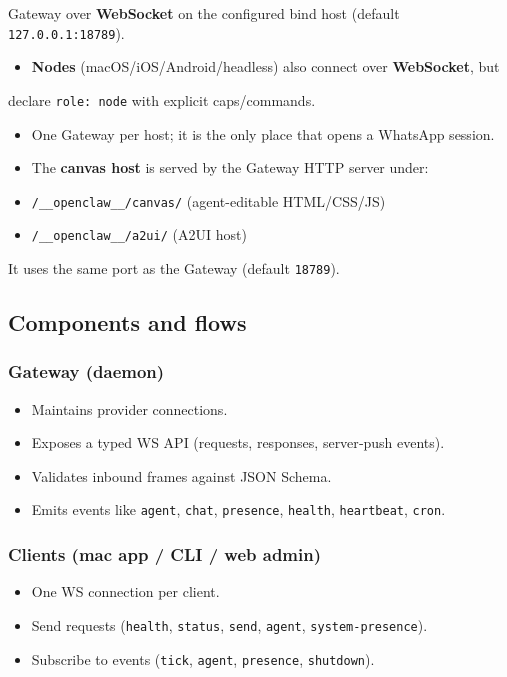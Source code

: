 Gateway over \textbf{WebSocket} on the configured bind host (default
\texttt{127.0.0.1:18789}).
\begin{itemize}
  \item \textbf{Nodes} (macOS/iOS/Android/headless) also connect over \textbf{WebSocket}, but
\end{itemize}

declare \texttt{role: node} with explicit caps/commands.
\begin{itemize}
  \item One Gateway per host; it is the only place that opens a WhatsApp session.
  \item The \textbf{canvas host} is served by the Gateway HTTP server under:
  \item \texttt{/\_\_openclaw\_\_/canvas/} (agent-editable HTML/CSS/JS)
  \item \texttt{/\_\_openclaw\_\_/a2ui/} (A2UI host)
\end{itemize}

It uses the same port as the Gateway (default \texttt{18789}).

\subsection{Components and flows}


\subsubsection{Gateway (daemon)}


\begin{itemize}
  \item Maintains provider connections.
  \item Exposes a typed WS API (requests, responses, server‑push events).
  \item Validates inbound frames against JSON Schema.
  \item Emits events like \texttt{agent}, \texttt{chat}, \texttt{presence}, \texttt{health}, \texttt{heartbeat}, \texttt{cron}.
\end{itemize}


\subsubsection{Clients (mac app / CLI / web admin)}


\begin{itemize}
  \item One WS connection per client.
  \item Send requests (\texttt{health}, \texttt{status}, \texttt{send}, \texttt{agent}, \texttt{system-presence}).
  \item Subscribe to events (\texttt{tick}, \texttt{agent}, \texttt{presence}, \texttt{shutdown}).
\end{itemize}


